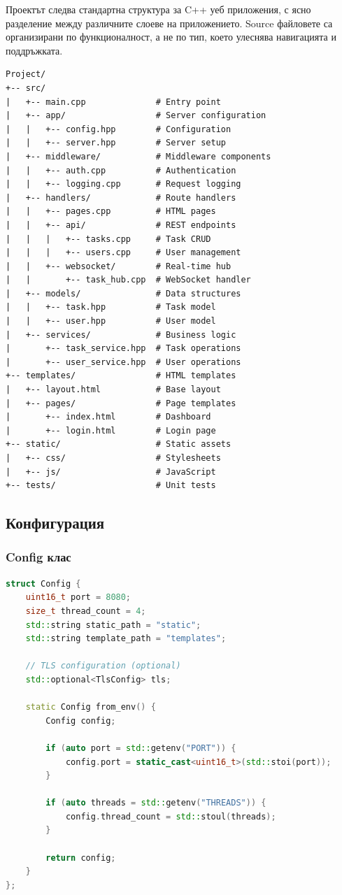 Проектът следва стандартна структура за C++ уеб приложения, с ясно разделение между различните слоеве на приложението. Source файловете са организирани по функционалност, а не по тип, което улеснява навигацията и поддръжката.

\begin{lstlisting}[basicstyle=\small\ttfamily, frame=none, numbers=none]
Project/
+-- src/
|   +-- main.cpp              # Entry point
|   +-- app/                  # Server configuration
|   |   +-- config.hpp        # Configuration
|   |   +-- server.hpp        # Server setup
|   +-- middleware/           # Middleware components
|   |   +-- auth.cpp          # Authentication
|   |   +-- logging.cpp       # Request logging
|   +-- handlers/             # Route handlers
|   |   +-- pages.cpp         # HTML pages
|   |   +-- api/              # REST endpoints
|   |   |   +-- tasks.cpp     # Task CRUD
|   |   |   +-- users.cpp     # User management
|   |   +-- websocket/        # Real-time hub
|   |       +-- task_hub.cpp  # WebSocket handler
|   +-- models/               # Data structures
|   |   +-- task.hpp          # Task model
|   |   +-- user.hpp          # User model
|   +-- services/             # Business logic
|       +-- task_service.hpp  # Task operations
|       +-- user_service.hpp  # User operations
+-- templates/                # HTML templates
|   +-- layout.html           # Base layout
|   +-- pages/                # Page templates
|       +-- index.html        # Dashboard
|       +-- login.html        # Login page
+-- static/                   # Static assets
|   +-- css/                  # Stylesheets
|   +-- js/                   # JavaScript
+-- tests/                    # Unit tests
\end{lstlisting}

\subsection{Конфигурация}

\subsubsection{Config клас}

\begin{lstlisting}[language=C++, basicstyle=\small\ttfamily, caption={Configuration class}]
struct Config {
    uint16_t port = 8080;
    size_t thread_count = 4;
    std::string static_path = "static";
    std::string template_path = "templates";
    
    // TLS configuration (optional)
    std::optional<TlsConfig> tls;
    
    static Config from_env() {
        Config config;
        
        if (auto port = std::getenv("PORT")) {
            config.port = static_cast<uint16_t>(std::stoi(port));
        }
        
        if (auto threads = std::getenv("THREADS")) {
            config.thread_count = std::stoul(threads);
        }
        
        return config;
    }
};
\end{lstlisting}

